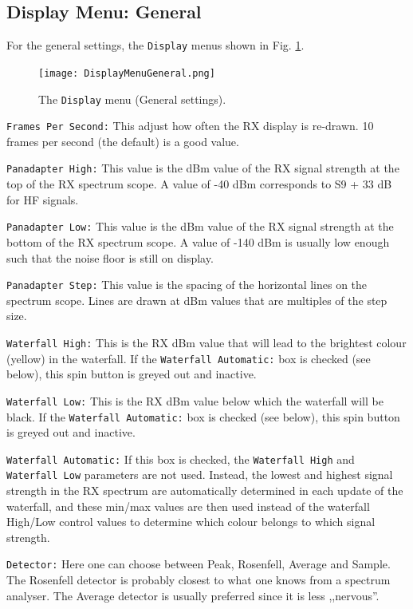 \documentclass[12pt]{book}
\def\rett#1{\texttt{\color{red}#1}}
\def\bltt#1{\texttt{\color{blue}#1}}
\begin{document}
\subsection{Display Menu: General}

For the general settings, the \bltt{Display} menus shown
in Fig. \ref{fig:DisplayMenuGeneral}.

\begin{figure}[ht]
\center
\texttt{[image: DisplayMenuGeneral.png]}
\caption{The \bltt{Display} menu (General settings).}
\label{fig:DisplayMenuGeneral}
\end{figure}



\rett{Frames Per Second:} This adjust how often the RX display is re-drawn.
10 frames per second (the default) is a good value.

\rett{Panadapter High:} This value is the dBm value of the RX signal strength at the
top of the RX spectrum scope. A value of -40 dBm corresponds to S9 + 33 dB for HF
signals.

\rett{Panadapter Low:} This value is the dBm value of the RX signal strength at the
bottom of the RX spectrum scope. A value of -140 dBm is usually low enough such that
the noise floor is still on display.

\rett{Panadapter Step:} This value is the spacing of the horizontal lines on
the spectrum scope. Lines are drawn at dBm values that are multiples of the step
size.

\rett{Waterfall High:} This is the RX dBm value that will lead to the brightest
colour (yellow) in the waterfall. If the \rett{Waterfall Automatic:} box is checked
(see below), this spin button is greyed out and inactive.

\rett{Waterfall Low:} This is the RX dBm value below which the waterfall will be black.
If the \rett{Waterfall Automatic:} box is checked
(see below), this spin button is greyed out and inactive.

\rett{Waterfall Automatic:} If this box is checked, the \rett{Waterfall High} and
\rett{Waterfall Low} parameters are not used. Instead,
the lowest and highest signal strength in the RX spectrum are automatically determined
in each update of the waterfall, and these min/max values
are then used instead of the waterfall High/Low control values to determine which
colour belongs to which signal strength.

\rett{Detector:} Here one can choose between Peak, Rosenfell, Average and Sample. The
Rosenfell detector is probably closest to what one knows from a spectrum analyser.
The Average detector is usually preferred since it is less ,,nervous''.
\end{document}
